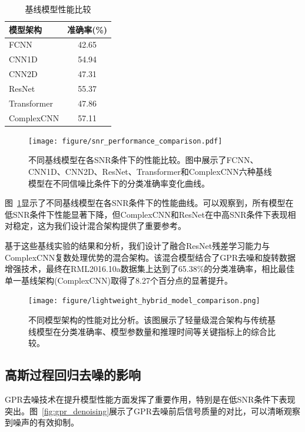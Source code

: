 \documentclass[conference]{IEEEtran}
\begin{document}
\begin{table}[h]
\centering
\caption{基线模型性能比较}
\label{tab:baseline_comparison}
\begin{tabular}{@{}lc@{}} %
\toprule
模型架构 & 准确率(\%) \\
\midrule
FCNN & 42.65 \\
CNN1D & 54.94 \\
CNN2D & 47.31 \\
ResNet & 55.37 \\
Transformer & 47.86 \\
ComplexCNN & 57.11 \\
\bottomrule
\end{tabular}
\end{table}

\begin{figure}[htbp]
\centering
\texttt{[image: figure/snr\_performance\_comparison.pdf]}
\caption{不同基线模型在各SNR条件下的性能比较。图中展示了FCNN、CNN1D、CNN2D、ResNet、Transformer和ComplexCNN六种基线模型在不同信噪比条件下的分类准确率变化曲线。}
\label{fig:snr_performance}
\end{figure}

图~\ref{fig:snr_performance}显示了不同基线模型在各SNR条件下的性能曲线。可以观察到，所有模型在低SNR条件下性能显著下降，但ComplexCNN和ResNet在中高SNR条件下表现相对稳定，这为我们设计混合架构提供了重要参考。

基于这些基线实验的结果和分析，我们设计了融合ResNet残差学习能力与ComplexCNN复数处理优势的混合架构。该混合模型结合了GPR去噪和旋转数据增强技术，最终在RML2016.10a数据集上达到了65.38\%的分类准确率，相比最佳单一基线架构(ComplexCNN)取得了8.27个百分点的显著提升。

\begin{figure}[htbp]
\centering
\texttt{[image: figure/lightweight\_hybrid\_model\_comparison.png]}
\caption{不同模型架构的性能对比分析。该图展示了轻量级混合架构与传统基线模型在分类准确率、模型参数量和推理时间等关键指标上的综合比较。}
\label{fig:model_comparison}
\end{figure}

\subsection{高斯过程回归去噪的影响}

GPR去噪技术在提升模型性能方面发挥了重要作用，特别是在低SNR条件下表现突出。图~\ref{fig:gpr_denoising}展示了GPR去噪前后信号质量的对比，可以清晰观察到噪声的有效抑制。
\end{document}
